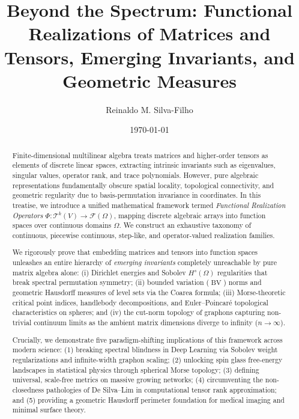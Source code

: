 \documentclass[11pt,a4paper,reqno]{amsart}
\title[Beyond the Spectrum]{Beyond the Spectrum: Functional Realizations of Matrices and Tensors, Emerging Invariants, and Geometric Measures}
\author{Reinaldo M. Silva-Filho}
\date{\today}
\theoremstyle{definition}
\numberwithin{equation}{section}
\providecommand{\BV}{\operatorname{BV}}
\providecommand{\BV}{\mathrm{BV}}
\begin{document}
\begin{abstract}
Finite-dimensional multilinear algebra treats matrices and higher-order tensors as elements of discrete linear spaces, extracting intrinsic invariants such as eigenvalues, singular values, operator rank, and trace polynomials. However, pure algebraic representations fundamentally obscure spatial locality, topological connectivity, and geometric regularity due to basis-permutation invariance in coordinates. In this treatise, we introduce a unified mathematical framework termed \emph{Functional Realization Operators} $\Phi \colon \mathcal{T}^k(V) \to \mathcal{F}(\Omega)$, mapping discrete algebraic arrays into function spaces over continuous domains $\Omega$. We construct an exhaustive taxonomy of continuous, piecewise continuous, step-like, and operator-valued realization families. 

We rigorously prove that embedding matrices and tensors into function spaces unleashes an entire hierarchy of \emph{emerging invariants} completely unreachable by pure matrix algebra alone: (i) Dirichlet energies and Sobolev $H^s(\Omega)$ regularities that break spectral permutation symmetry; (ii) bounded variation ($\BV$) norms and geometric Hausdorff measures of level sets via the Coarea formula; (iii) Morse-theoretic critical point indices, handlebody decompositions, and Euler--Poincar\'e topological characteristics on spheres; and (iv) the cut-norm topology of graphons capturing non-trivial continuum limits as the ambient matrix dimensions diverge to infinity ($n \to \infty$). 

Crucially, we demonstrate five paradigm-shifting implications of this framework across modern science: (1) breaking spectral blindness in Deep Learning via Sobolev weight regularizations and infinite-width graphon scaling; (2) unlocking spin glass free-energy landscapes in statistical physics through spherical Morse topology; (3) defining universal, scale-free metrics on massive growing networks; (4) circumventing the non-closedness pathologies of De Silva--Lim in computational tensor rank approximation; and (5) providing a geometric Hausdorff perimeter foundation for medical imaging and minimal surface theory.
\end{abstract}

\end{document}
